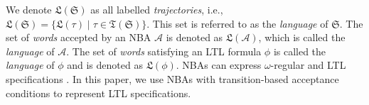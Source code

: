 We denote $\mathfrak{L}(\mathfrak{S})$ as all labelled \emph{trajectories}, i.e., $\mathfrak{L}(\mathfrak{S})=\{\mathfrak{L}(\tau) \mid \tau \in \mathfrak{T}(\mathfrak{S})\}$. This set is referred to as the \emph{language} of \(\mathfrak{S}\). The set of \emph{words} accepted by an NBA \(\mathcal{A}\) is denoted as \(\mathfrak{L}(\mathcal{A})\), which is called the \emph{language} of $\mathcal{A}$. The set of \emph{words} satisfying an LTL formula \(\phi\) is called the \emph{language} of \(\phi\) and is denoted as \(\mathfrak{L}(\phi)\). NBAs can express $\omega$-regular and LTL specifications \cite{vardi2005automata}. In this paper, we use NBAs with transition-based acceptance conditions to represent LTL specifications.
